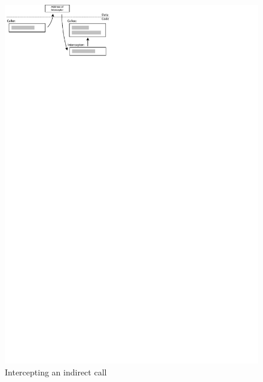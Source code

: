 \begin{figure}[htbp] 
\begin{centering} 
\includegraphics[scale=1, clip=true, viewport=0cm 25cm 9cm 30cm]{images/diagrams/IndirectCalls_Thunked.pdf} 
\caption{Intercepting an indirect call} 
\label{IndirectCalls_Thunked} 
\end{centering} 
\end{figure}


